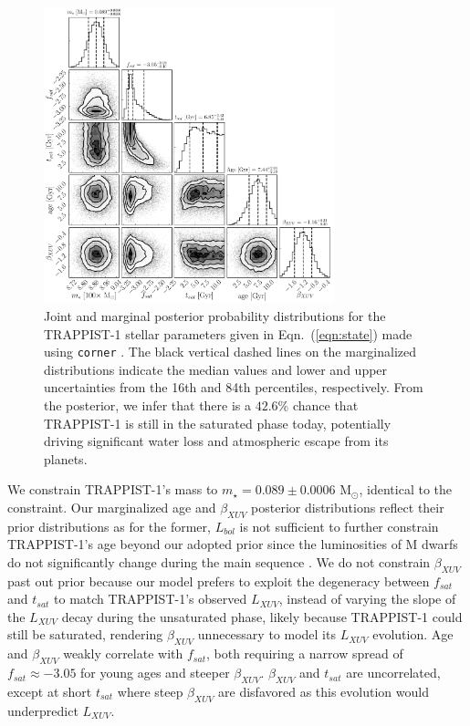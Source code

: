 \documentclass[twocolumn]{aastex62}
\begin{document}
\begin{figure}[t]
\centering
	\includegraphics[width=0.75\textwidth]{../Analysis/Corner/trappist1Corner.pdf}
   \caption{Joint and marginal posterior probability distributions for the TRAPPIST-1 stellar parameters given in Eqn.~(\ref{eqn:state}) made using \texttt{corner} \citep{ForemanMackey2016}. The black vertical dashed lines on the marginalized distributions indicate the median values and lower and upper uncertainties from the 16th and 84th percentiles, respectively. From the posterior, we infer that there is a $42.6\%$ chance that TRAPPIST-1 is still in the saturated phase today, potentially driving significant water loss and atmospheric escape from its planets.}%
    \label{fig:corner}%
\end{figure}

We constrain TRAPPIST-1's mass to $m_{\star} = 0.089 \pm{0.0006}$ M$_{\odot}$, identical to the \citet{vanGrootel2018} constraint. Our marginalized age and $\beta_{XUV}$ posterior distributions reflect their prior distributions as for the former, $L_{bol}$ is not sufficient to further constrain TRAPPIST-1's age beyond our adopted prior since the luminosities of M dwarfs do not significantly change during the main sequence \citep{Baraffe2015}. We do not constrain $\beta_{XUV}$ past out prior because our model prefers to exploit the degeneracy between $f_{sat}$ and $t_{sat}$ to match TRAPPIST-1's observed $L_{XUV}$, instead of varying the slope of the $L_{XUV}$ decay during the unsaturated phase, likely because TRAPPIST-1 could still be saturated, rendering $\beta_{XUV}$ unnecessary to model its $L_{XUV}$ evolution. Age and $\beta_{XUV}$ weakly correlate with $f_{sat}$, both requiring a narrow spread of $f_{sat} \approx -3.05$ for young ages and steeper $\beta_{XUV}$. $\beta_{XUV}$ and $t_{sat}$ are uncorrelated, except at short $t_{sat}$ where steep $\beta_{XUV}$ are disfavored as this evolution would underpredict $L_{XUV}$.
\end{document}

